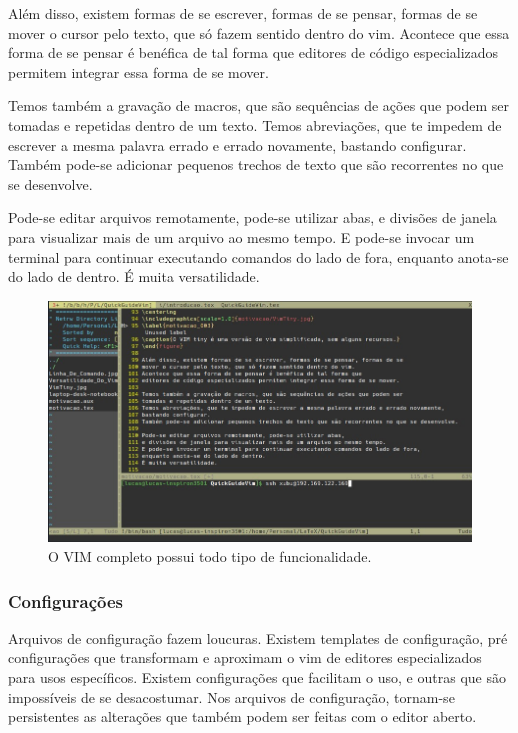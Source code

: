 Além disso, existem formas de se escrever, formas de se pensar, formas de se
mover o cursor pelo texto, que só fazem sentido dentro do vim.
Acontece que essa forma de se pensar é benéfica de tal forma que
editores de código especializados permitem integrar essa forma de se mover.

Temos também a gravação de macros, que são sequências de ações que podem ser
tomadas e repetidas dentro de um texto.
Temos abreviações, que te impedem de escrever a mesma palavra errado e errado novamente,
bastando configurar.
Também pode-se adicionar pequenos trechos de texto que são recorrentes no que se desenvolve.

Pode-se editar arquivos remotamente, pode-se utilizar abas,
e divisões de janela para visualizar mais de um arquivo ao mesmo tempo.
E pode-se invocar um terminal para continuar executando comandos do lado de fora,
enquanto anota-se do lado de dentro.
É muita versatilidade.

\begin{figure}[!ht]
\centering
\includegraphics[scale=0.7]{motivacao/Versatilidade_Do_Vim.jpg}
\caption{O VIM completo possui todo tipo de funcionalidade.}
\end{figure}

\subsubsection{Configurações}
Arquivos de configuração fazem loucuras.
Existem templates de configuração, pré configurações
que transformam e aproximam o vim de editores especializados para usos específicos.
Existem configurações que facilitam o uso, e outras que são impossíveis de se desacostumar.
Nos arquivos de configuração, tornam-se persistentes as alterações que também podem ser feitas com o editor aberto.

